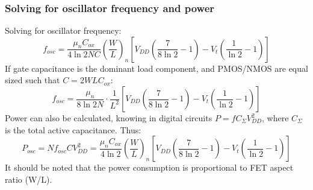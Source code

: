 		\subsubsection{Solving for oscillator frequency and power}
			Solving for oscillator frequency:
			\begin{equation}
				f_{osc} = \frac{\mu_nC_{ox}}{4\ln2NC}\left(\frac{W}{L}\right)_n\left[V_{DD}\left(\frac{7}{8\ln2}-1\right)-V_t\left(\frac{1}{\ln2}-1\right) \right]
			\end{equation}
			If gate capacitance is the dominant load component, and PMOS/NMOS are equal sized such that $C=2WLC_{ox}$:
			\begin{equation}
				f_{osc} = \frac{\mu_n}{8\ln2N}\cdot\frac{1}{L^2}\left[V_{DD}\left(\frac{7}{8\ln2}-1\right)-V_t\left(\frac{1}{\ln2}-1\right) \right]
			\end{equation}
			Power can also be calculated, knowing in digital circuits $P = fC_{\Sigma}V_{DD}^2$, where $C_{\Sigma}$ is the total active capacitance. Thus:
			\begin{equation}
				P_{osc} = Nf_{osc}CV_{DD}^2 = \frac{\mu_nC_{ox}}{4\ln2}\left(\frac{W}{L}\right)_n\left[V_{DD}\left(\frac{7}{8\ln2}-1\right)-V_t\left(\frac{1}{\ln2}-1\right) \right]
			\end{equation}
			It should be noted that the power consumption is proportional to FET aspect ratio (W/L).

